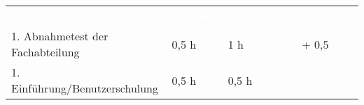 \begin{tabular}{llll}
\rowcolor{heading}\textcolor{white}{\textbf{Vorgang}} & \textcolor{white}{\textbf{Geplant}} & \textcolor{white}{\textbf{Tatsächlich}} & \textcolor{white}{\textbf{Differenz}} \\
1. Abnahmetest der Fachabteilung & 0,5 h   & 1 h   & + 0,5  \\
1. Einführung/Benutzerschulung & 0,5 h   & 0,5 h   &  \\
\end{tabular}

